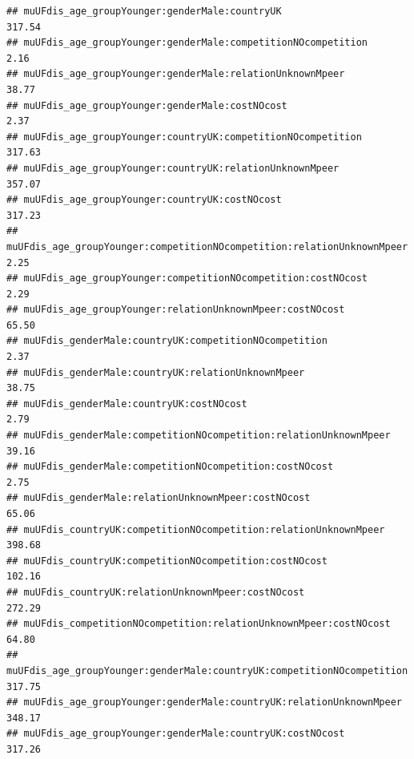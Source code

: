 \documentclass[
]{article}
\begin{document}
\begin{verbatim}
## muUFdis_age_groupYounger:genderMale:countryUK                                                             317.54
## muUFdis_age_groupYounger:genderMale:competitionNOcompetition                                                2.16
## muUFdis_age_groupYounger:genderMale:relationUnknownMpeer                                                   38.77
## muUFdis_age_groupYounger:genderMale:costNOcost                                                              2.37
## muUFdis_age_groupYounger:countryUK:competitionNOcompetition                                               317.63
## muUFdis_age_groupYounger:countryUK:relationUnknownMpeer                                                   357.07
## muUFdis_age_groupYounger:countryUK:costNOcost                                                             317.23
## muUFdis_age_groupYounger:competitionNOcompetition:relationUnknownMpeer                                      2.25
## muUFdis_age_groupYounger:competitionNOcompetition:costNOcost                                                2.29
## muUFdis_age_groupYounger:relationUnknownMpeer:costNOcost                                                   65.50
## muUFdis_genderMale:countryUK:competitionNOcompetition                                                       2.37
## muUFdis_genderMale:countryUK:relationUnknownMpeer                                                          38.75
## muUFdis_genderMale:countryUK:costNOcost                                                                     2.79
## muUFdis_genderMale:competitionNOcompetition:relationUnknownMpeer                                           39.16
## muUFdis_genderMale:competitionNOcompetition:costNOcost                                                      2.75
## muUFdis_genderMale:relationUnknownMpeer:costNOcost                                                         65.06
## muUFdis_countryUK:competitionNOcompetition:relationUnknownMpeer                                           398.68
## muUFdis_countryUK:competitionNOcompetition:costNOcost                                                     102.16
## muUFdis_countryUK:relationUnknownMpeer:costNOcost                                                         272.29
## muUFdis_competitionNOcompetition:relationUnknownMpeer:costNOcost                                           64.80
## muUFdis_age_groupYounger:genderMale:countryUK:competitionNOcompetition                                    317.75
## muUFdis_age_groupYounger:genderMale:countryUK:relationUnknownMpeer                                        348.17
## muUFdis_age_groupYounger:genderMale:countryUK:costNOcost                                                  317.26

\end{verbatim}
\end{document}
